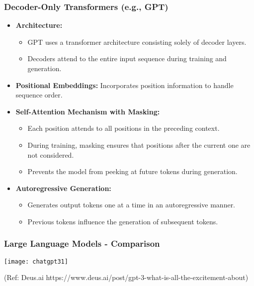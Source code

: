 \begin{frame}[fragile]\frametitle{Decoder-Only Transformers (e.g., GPT)}

  \begin{itemize}
    \item \textbf{Architecture:} 
      \begin{itemize}
        \item GPT uses a transformer architecture consisting solely of decoder layers.
        \item Decoders attend to the entire input sequence during training and generation.
      \end{itemize}

    \item \textbf{Positional Embeddings:} Incorporates position information to handle sequence order.

    \item \textbf{Self-Attention Mechanism with Masking:}
      \begin{itemize}
        \item Each position attends to all positions in the preceding context.
        \item During training, masking ensures that positions after the current one are not considered.
        \item Prevents the model from peeking at future tokens during generation.
      \end{itemize}

    \item \textbf{Autoregressive Generation:} 
      \begin{itemize}
        \item Generates output tokens one at a time in an autoregressive manner.
        \item Previous tokens influence the generation of subsequent tokens.
      \end{itemize}

  \end{itemize}

\end{frame}

\begin{frame}[fragile]\frametitle{Large Language Models - Comparison}

\begin{center}
\texttt{[image: chatgpt31]}
\end{center}				
{\tiny (Ref: Deus.ai https://www.deus.ai/post/gpt-3-what-is-all-the-excitement-about)}

\end{frame}

